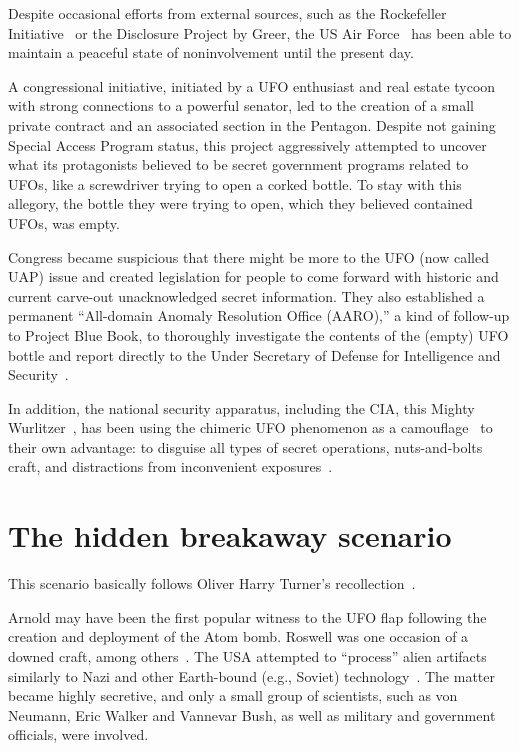 Despite occasional efforts from external sources, such as the Rockefeller Initiative~\cite{Berliner2000Jun} or the Disclosure Project by Greer,
the US Air Force~\cite{Greer-dp} has been able to maintain a peaceful state of noninvolvement until the present day.

A congressional initiative, initiated by a UFO enthusiast and real estate tycoon with strong connections to a powerful senator,
led to the creation of a small private contract and an associated section in the Pentagon.
Despite not gaining Special Access Program status, this project aggressively attempted
to uncover what its protagonists believed to be secret government programs related to UFOs,
like a screwdriver trying to open a corked bottle.
To stay with this allegory, the bottle they were trying to open, which they believed contained UFOs, was empty.

Congress became suspicious that there might be more to the UFO (now called UAP) issue and created legislation for people to come forward with historic and current carve-out unacknowledged secret information. They also established a permanent ``All-domain Anomaly Resolution Office (AARO),'' a kind of follow-up to Project Blue Book, to thoroughly investigate the contents of the (empty) UFO bottle and report directly to the Under Secretary of Defense for Intelligence and Security~\cite{AARO22}.

In addition, the national security apparatus, including the CIA, this
Mighty Wurlitzer~\cite{Loory1974,Bernstein1977,Wilford2009,Covert2016}, has been
using the chimeric UFO phenomenon as a camouflage~\cite{SnowdenTweet2023Feb}
to their own advantage:
to disguise all types of secret operations, nuts-and-bolts craft, and distractions from inconvenient exposures~\cite{HershsubstackFeb3,Hersh2023Feb}.


\section{The hidden breakaway scenario}
\label{2023-UFO-part-Speculation-executive-summary-hb} %

This scenario basically follows Oliver Harry Turner's recollection~\cite{TurnerAustralia1971}.

Arnold may have been the first popular witness to the UFO flap following the creation and deployment of the Atom bomb.
Roswell was one occasion of a downed craft, among others~\cite{Vallee2021May}.
The USA attempted to ``process'' alien artifacts similarly to Nazi and other Earth-bound (e.g., Soviet)
technology~\cite{SmithWilbertNotes, Sarbacher-83}. The matter became highly secretive, and only a small group of scientists,
such as von Neumann, Eric Walker and Vannevar Bush, as well as military and government officials, were involved.

